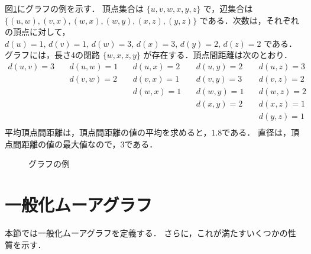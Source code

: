 \begin{example}
  図\ref{fig:graph-example}にグラフの例を示す．
  頂点集合は
  $\{u,v,w,x,y,z\}$
  で，辺集合は
  $\{(u,w),(v,x),(w,x),(w,y),(x,z),(y,z)\}$
  である．次数は，それぞれの頂点に対して，
  $d(u)=1,\,d(v)=1,\,d(w)=3,\,d(x)=3,\,d(y)=2,\,d(z)=2$
  である．グラフには，長さ4の閉路
  $\{w,x,z,y\}$
  が存在する．頂点間距離は次のとおり．
  \begin{equation*}
    \begin{aligned}
      d(u,v)=3&\:&d(u,w)=1&\:&d(u,x)=2&\:&d(u,y)=2&\:&d(u,z)=3 \\
      &\:&d(v,w)=2&\:&d(v,x)=1&\:&d(v,y)=3&\:&d(v,z)=2 \\
      &\:&&\:&d(w,x)=1&\:&d(w,y)=1&\:&d(w,z)=2 \\
      &\:&&\:&&\:&d(x,y)=2&\:&d(x,z)=1 \\
      &\:&&\:&&\:&&\:&d(y,z)=1 \\
    \end{aligned}
  \end{equation*}
  平均頂点間距離は，頂点間距離の値の平均を求めると，$1.8$である．
  直径は，頂点間距離の値の最大値なので，$3$である．
  \begin{figure}
    \centering
    
    \caption{グラフの例}
    \label{fig:graph-example}
  \end{figure}
\end{example}

\section{一般化ムーアグラフ}
\label{sect:generalized-moore-graph}
本節では一般化ムーアグラフを定義する．
さらに，これが満たすいくつかの性質を示す．

